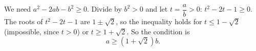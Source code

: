 We need $a^2-2ab-b^2\ge0$. Divide by $b^2>0$ and let $t=\dfrac ab>0$: $t^2-2t-1\ge0$. The roots of $t^2-2t-1$ are $1\pm\sqrt2$, so the inequality holds for $t\le1-\sqrt2$ (impossible, since $t>0$) or $t\ge1+\sqrt2$. So the condition is
\[\boxed{a\ge\left(1+\sqrt2\right)b}.\]
